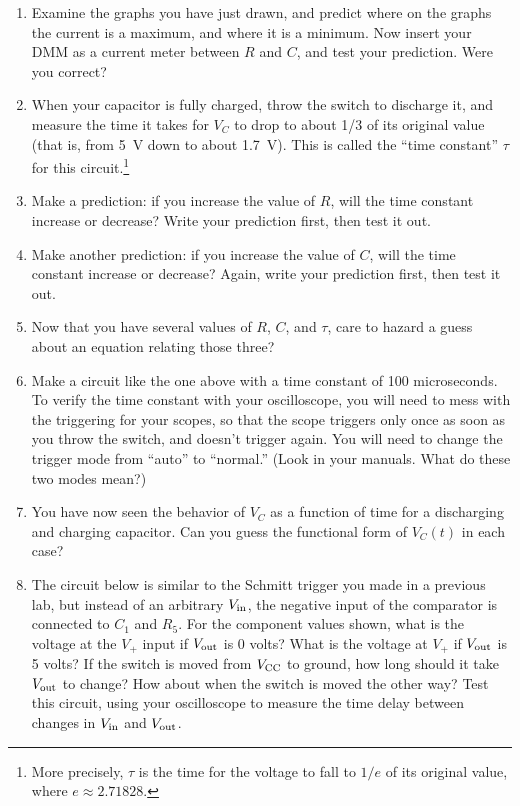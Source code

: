 \begin{enumerate}[wide]
\item Examine the graphs you have just drawn, and predict where on the graphs the current is a maximum, and where it is a minimum.  Now insert your DMM as a current meter between $R$ and $C$, and test your prediction.  Were you correct?

\item When your capacitor is fully charged, throw the switch to discharge it, and measure the time it takes for $V_C$ to drop to about 1/3 of its original value (that is, from 5~V down to about 1.7~V).  This is called the ``time constant'' $\tau$ for this circuit.\footnote{More precisely, $\tau$ is the time for the voltage to fall to $1/e$ of its original value, where $e \approx 2.71828$.}

\item Make a prediction: if you increase the value of $R$, will the time constant increase or decrease?  Write your prediction first, then test it out.

\item Make another prediction: if you increase the value of $C$, will the time constant increase or decrease?  Again, write your prediction first, then test it out.

\item Now that you have several values of $R$, $C$, and $\tau$, care to hazard a guess about an equation relating those three?

\item Make a circuit like the one above with a time constant of 100 microseconds.   To verify the time constant with your oscilloscope, you will need to mess with the triggering for your scopes, so that the scope triggers only once as soon as you throw the switch, and doesn't trigger again.  You will need to change the trigger mode from ``auto'' to ``normal.''  (Look in your manuals.  What do these two modes mean?)

\item You have now seen the behavior of $V_C$ as a function of time for a discharging and charging capacitor.  Can you guess the functional form of $V_C(t)$ in each case?

\pagebreak[4]
\item The circuit below is similar to the Schmitt trigger you made in a previous lab, but instead of an arbitrary $V_{\rm in}$, the negative input of the comparator is connected to $C_1$ and $R_5$.  
For the component values shown, what is the voltage at the $V_+$ input if $V_{\rm out}$ is 0 volts?  
What is the voltage at $V_+$ if $V_{\rm out}$ is 5 volts?  
If the switch is moved from $V_{\rm CC}$ to ground, how long should it take $V_{\rm out}$ to change?  How about when the switch is moved the other way?  Test this circuit, using your oscilloscope to measure the time delay between changes in $V_{\rm in}$ and $V_{\rm out}$. \label{part_delay_switch}


\end{enumerate}
